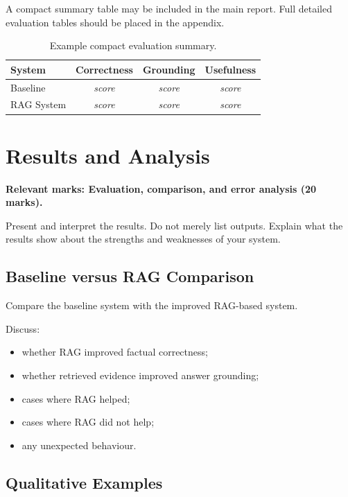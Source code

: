 \documentclass[10pt,conference]{IEEEtran}
\begin{document}
A compact summary table may be included in the main report. 
Full detailed evaluation tables should be placed in the appendix.

\begin{table}[h]
\centering
\caption{Example compact evaluation summary.}
\label{tab:evaluation-summary}
\begin{tabularx}{\linewidth}{lccc}
\toprule
System & Correctness & Grounding & Usefulness \\
\midrule
Baseline & \emph{score} & \emph{score} & \emph{score} \\
RAG System & \emph{score} & \emph{score} & \emph{score} \\
\bottomrule
\end{tabularx}
\end{table}

\section{Results and Analysis}
\label{sec:results}

\textbf{Relevant marks: Evaluation, comparison, and error analysis (20 marks).}

Present and interpret the results. 
Do not merely list outputs. 
Explain what the results show about the strengths and weaknesses of your system.

\subsection{Baseline versus RAG Comparison}

Compare the baseline system with the improved RAG-based system.

Discuss:

\begin{itemize}
    \item whether RAG improved factual correctness;
    \item whether retrieved evidence improved answer grounding;
    \item cases where RAG helped;
    \item cases where RAG did not help;
    \item any unexpected behaviour.
\end{itemize}

\subsection{Qualitative Examples}
\end{document}
